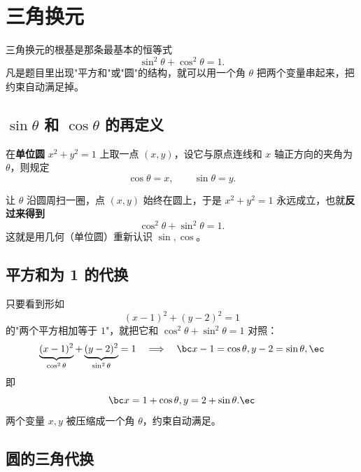 \chapter{三角换元}

三角换元的根基是那条最基本的恒等式
\[
\sin^2\theta+\cos^2\theta=1.
\]
凡是题目里出现"平方和"或"圆"的结构，就可以用一个角 $\theta$ 把两个变量串起来，把约束自动满足掉。

\section{$\sin\theta$ 和 $\cos\theta$ 的再定义}

在\textbf{单位圆} $x^2+y^2=1$ 上取一点 $(x,y)$，设它与原点连线和 $x$ 轴正方向的夹角为 $\theta$，则规定
\[
\cos\theta=x,\qquad \sin\theta=y.
\]

\begin{center}
\end{center}

让 $\theta$ 沿圆周扫一圈，点 $(x,y)$ 始终在圆上，于是 $x^2+y^2=1$ 永远成立，也就\textbf{反过来得到}
\[
\cos^2\theta+\sin^2\theta=1.
\]
这就是用几何（单位圆）重新认识 $\sin,\cos$。

\section{平方和为 1 的代换}

只要看到形如
\[
(x-1)^2+(y-2)^2=1
\]
的"两个平方相加等于 $1$"，就把它和 $\cos^2\theta+\sin^2\theta=1$ 对照：
\[
\underbrace{(x-1)^2}_{\cos^2\theta}+\underbrace{(y-2)^2}_{\sin^2\theta}=1
\quad\Longrightarrow\quad
\bc
x-1=\cos\theta,\\
y-2=\sin\theta,
\ec
\]
即
\[
\bc
x=1+\cos\theta,\\
y=2+\sin\theta.
\ec
\]
两个变量 $x,y$ 被压缩成一个角 $\theta$，约束自动满足。

\section{圆的三角代换}

